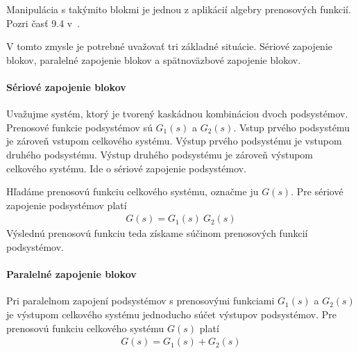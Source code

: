 \documentclass[a4paper, 10pt, ]{article}
\begin{document}
Manipulácia s takýmito blokmi je jednou z aplikácií algebry prenosových funkcií. Pozri časť 9.4 v~\cite{AsM08se}.

V tomto zmysle je potrebné uvažovať tri základné situácie. Sériové zapojenie blokov, paralelné zapojenie blokov a spätnoväzbové zapojenie blokov.



\paragraph{Sériové zapojenie blokov}

Uvažujme systém, ktorý je tvorený kaskádnou kombináciou dvoch podsystémov. Prenosové funkcie podsystémov sú $G_1(s)$ a $G_2(s)$. Vstup prvého podsystému je zároveň vstupom celkového systému. Výstup prvého podsystému je vstupom druhého podsystému. Výstup druhého podsystému je zároveň výstupom celkového systému. Ide o sériové zapojenie podsystémov.

\begin{center}

    \makebox[\textwidth][c]{%
    
    }

	\label{TFalgebra_seriove}

\end{center}

Hľadáme prenosovú funkciu celkového systému, označme ju $G(s)$. Pre sériové zapojenie podsystémov platí
\begin{align}
    G(s) = G_1(s)\ G_2(s)
\end{align}
Výslednú prenosovú funkciu teda získame súčinom prenosových funkcií podsystémov.




\paragraph{Paralelné zapojenie blokov}

\begin{center}

    \makebox[\textwidth][c]{%
    
    }

	\label{TFalgebra_paralelne}

\end{center}

Pri paralelnom zapojení podsystémov s prenosovými funkciami $G_1(s)$ a $G_2(s)$ je výstupom celkového systému jednoducho súčet výstupov podsystémov. Pre prenosovú funkciu celkového systému $G(s)$ platí
\begin{align}
    G(s) = G_1(s) + G_2(s)
\end{align}
\end{document}
